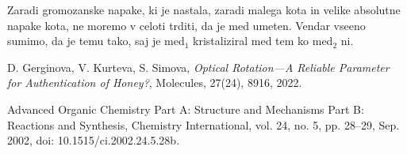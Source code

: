 \documentclass[a4paper,12pt]{article}
\begin{document}
Zaradi gromozanske napake, ki je nastala, zaradi malega kota in velike absolutne napake kota, ne moremo v celoti trditi, da je med umeten. 
Vendar vseeno sumimo, da je temu tako, saj je med$_1$ kristaliziral med tem ko med$_2$ ni. 




    \begin{thebibliography}{9}
        D. Gerginova, V. Kurteva, S. Simova,
        \textit{Optical Rotation—A Reliable Parameter for Authentication of Honey?},
        Molecules, 27(24), 8916, 2022.

        Advanced Organic Chemistry Part A: Structure and Mechanisms Part B: Reactions and Synthesis, Chemistry International, vol. 24, no. 5, pp. 28–29, Sep. 2002, doi: 10.1515/ci.2002.24.5.28b.
    \end{thebibliography}
\end{document}
